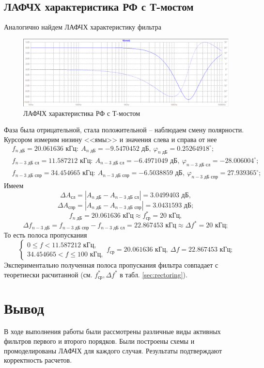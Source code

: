 \documentclass[a4paper, 12pt]{article}
\begin{document}
    \subsection{ЛАФЧХ характеристика РФ с Т-мостом}
    Аналогично найдем ЛАФЧХ характеристику фильтра
    \begin{figure}[H]
        \centering
        \includegraphics[scale=0.46]{5task_lapfr.png}
        \captionsetup{skip=0pt}
        \caption{ЛАФЧХ характеристика РФ с Т-мостом}
        \label{fig:5task_lapfr}
    \end{figure}
    \noindent Фаза была отрицательной, стала положительной -- наблюдаем смену полярности.
    Курсором измерим низину <<ямы>> и значения слева и справа от нее
    \begin{align*}
        &f_{n\text{ дБ}}=20.061636\text{ кГц}:\ A_{n\text{ дБ}}=-9.5470452\text{ дБ},\ \varphi_{n\text{ дБ}}=0.25264918^{\circ};\\
        &f_{n-3\text{ дБ сл}}=11.587212 \text{ кГц}:\ A_{n-3\text{ дБ сл}}=-6.4971049\text{ дБ},\ \varphi_{n-3\text{ дБ сл}}=-28.006004^{\circ};\\
        &f_{n-3\text{ дБ спр}}=34.454665 \text{ кГц}:\ A_{n-3\text{ дБ спр}}=-6.5038859\text{ дБ},\ \varphi_{n-3\text{ дБ спр}}=27.939365^{\circ};
    \end{align*}
    Имеем
    $$
    \Delta A_\text{сл}=|A_{n\text{ дБ}}-A_{n-3\text{ дБ сл}}|=3.0499403\text{ дБ},
    $$
    $$
    \Delta A_\text{спр}=|A_{n\text{ дБ}}-A_{n-3\text{ дБ спр}}|=3.0431593\text{ дБ};
    $$
    $$
    f_{n\text{ дБ}}=20.061636\text{ кГц}\approx f_\text{ср}^*=20\text{ кГц},
    $$
    $$
    \Delta f_{n-3\text{ дБ}}=f_{n-3\text{ дБ спр}}-f_{n-3\text{ дБ сл}}=22.867453\text{ кГц}\approx \Delta f^*=20\text{ кГц};
    $$
    То есть полоса пропускания
    $$
    \begin{cases}
        0\leq f<11.587212 \text{ кГц},\\
        34.454665<f\leq100\text{ кГц},
    \end{cases} f_\text{ср}=20.061636\text{ кГц},\ \Delta f=22.867453\text{ кГц};
    $$
    Экспериментально полученная полоса пропускания фильтра совпадает с теоретиески расчитанной (см. $f_\text{ср}^*,\Delta f^*$ в табл. \ref{sec:rectoring}).


    \section{Вывод}
    В ходе выполнения работы были рассмотрены различные виды
    активных фильтров первого и второго порядков. Были построены
    схемы и промоделированы ЛАФЧХ для каждого случая. Результаты
    подтверждают корректность расчетов.
\end{document}
